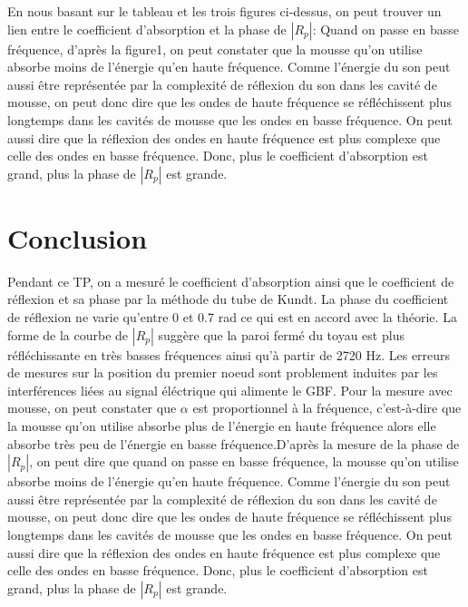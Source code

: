 \documentclass[a4paper,11pt]{article}
\begin{document}
\newpage

En nous basant sur le tableau et les trois figures ci-dessus, on peut trouver un lien entre le coefficient d'absorption et la phase de $|R_{p}|$: 
Quand on passe en basse fréquence, d'après la figure1, on peut constater que  la mousse qu'on utilise absorbe moins de l'énergie qu'en haute fréquence. Comme l'énergie du son peut aussi être représentée par la complexité de réflexion du son dans les cavité de mousse, on peut donc dire que  les ondes de haute fréquence se réfléchissent plus longtemps dans les cavités de mousse que les ondes en basse fréquence. On peut aussi dire que la réflexion des ondes en haute fréquence est plus complexe que celle des ondes en basse fréquence.
Donc, plus le coefficient d'absorption est grand, plus la phase de $|R_{p}|$ est grande.    
\newpage

\section{Conclusion}

Pendant ce TP, on a mesuré le coefficient d'absorption ainsi que le coefficient de réflexion et sa phase par la méthode du tube de Kundt. La phase du coefficient de réflexion ne varie qu'entre 0 et 0.7 rad ce qui est en accord avec la théorie. La forme de la courbe de $|R_{p}|$ suggère que la paroi fermé du toyau est plus réfléchissante en très basses fréquences ainsi qu'à partir de 2720 Hz.
\newline
Les erreurs de mesures sur la position du premier noeud sont problement induites par les interférences liées au signal éléctrique qui alimente le GBF.
\newline
\newline
Pour la mesure avec mousse, on peut constater que $\alpha$ est proportionnel à la fréquence, c'est-à-dire que la mousse qu'on utilise absorbe plus de l'énergie en haute fréquence alors elle absorbe très peu de l'énergie en basse fréquence.D'après la mesure de la phase de $|R_{p}|$, on peut dire que quand on passe en basse fréquence, la mousse qu'on utilise absorbe moins de l'énergie qu'en haute fréquence. Comme l'énergie du son peut aussi être représentée par la complexité de réflexion du son dans les cavité de mousse, on peut donc dire que  les ondes de haute fréquence se réfléchissent plus longtemps dans les cavités de mousse que les ondes en basse fréquence. On peut aussi dire que la réflexion des ondes en haute fréquence est plus complexe que celle des ondes en basse fréquence.
Donc, plus le coefficient d'absorption est grand, plus la phase de $|R_{p}|$ est grande.    

 
\end{document}
